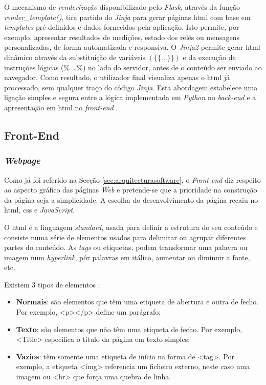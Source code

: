 O mecanismo de \textit{renderização} disponibilizado pelo \textit{Flask}, através da função \textit{render\_template()}, tira partido do \textit{Jinja} para gerar páginas \acrshort{html} com base em \textit{templates} pré-definidos e dados fornecidos pela aplicação. Isto permite, por exemplo, apresentar resultados de medições, estado dos relés ou mensagens personalizadas, de forma automatizada e responsiva. O \textit{Jinja2} permite gerar \acrshort{html} dinâmico através da substituição de variáveis $(\{\{ \ldots \}\})$ e da execução de instruções lógicas ({\% \ldots \%}) no lado do servidor, antes de o conteúdo ser enviado ao navegador. Como resultado, o utilizador final visualiza apenas o \acrshort{html} já processado, sem qualquer traço do código \textit{Jinja}. Esta abordagem estabelece uma ligação simples e segura entre a lógica implementada em \textit{Python} no \textit{back-end} e a apresentação em \acrshort{html} no \textit{front-end} \cite{Jinja}. 

\subsection{Front-End}
\label{sec:frontend}
\subsubsection{\textit{Webpage}}
Como já foi referido na Secção \ref{sec:arquitecturasoftware}, o \textit{Front-end} diz respeito ao aspecto gráfico das páginas \textit{Web} e pretende-se que a prioridade na construção da página seja a simplicidade. A escolha do desenvolvimento da página recaiu no \acrshort{html}, \acrshort{css} e \textit{JavaScript}.

O \acrshort{html} é a linguagem \textit{standard}, usada para definir a estrutura do seu conteúdo e consiste numa série de elementos usados para delimitar ou agrupar diferentes partes do conteúdo. As \textit{tags} ou etiquetas, podem transformar uma palavra ou imagem num \textit{hyperlink}, pôr palavras em itálico, aumentar ou diminuir a fonte, etc. \cite{HTMLbasics}

Existem 3 tipos de elementos \cite{HTMLwikipedia}:
\begin{itemize}
    \item \textbf{Normais}: são elementos que têm uma etiqueta de abertura e outra de fecho. Por exemplo, <p></p> define um parágrafo;
    \item \textbf{Texto}: são elementos que não têm uma etiqueta de fecho. Por exemplo, <Title> especifica o título da página em texto simples;
    \item \textbf{Vazios}: têm somente uma etiqueta de início na forma de <tag>. Por exemplo, a etiqueta <img> referencia um ficheiro externo, neste caso uma imagem ou <br> que força uma quebra de linha.
\end{itemize}

